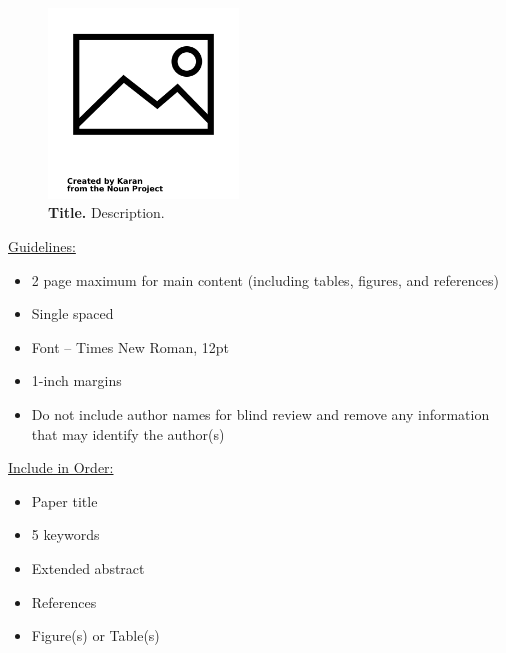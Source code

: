 \documentclass[a4paper,12pt]{article}
\begin{document}

\begin{figure}[h]
\centering
\includegraphics[width=0.45\textwidth]{noun-image-1269202.png}
\caption{\textbf{Title.} Description.}
\label{fig:image}
\end{figure}



\vskip 40pt
\underline {Guidelines:}
\begin{itemize}
\itemsep0pt
  \item 2 page maximum for main content (including tables, figures, and references)
  \item Single spaced
  \item Font – Times New Roman, 12pt
  \item 1-inch margins
  \item Do not include author names for blind review and remove any information that may identify the author(s)
\end{itemize}

\underline {Include in Order:}
\begin{itemize}
\itemsep0pt
  \item Paper title
  \item 5 keywords
  \item Extended abstract 
  \item References
  \item Figure(s) or Table(s)
\end{itemize}
\end{document}
